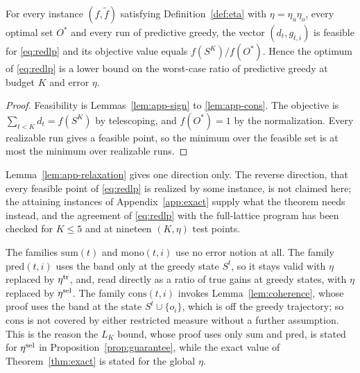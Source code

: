 \begin{lemma}[relaxation]\label{lem:app-relaxation}
For every instance $(f,\tilde f)$ satisfying Definition~\ref{def:eta} with
$\eta=\eta_u\eta_o$, every optimal set $O^{\ast}$ and every run of predictive
greedy, the vector $(d_t,g_{t,i})$ is feasible for \eqref{eq:redlp} and its
objective value equals $f(S^{K})/f(O^{\ast})$.  Hence the optimum of
\eqref{eq:redlp} is a lower bound on the worst-case ratio of predictive greedy
at budget $K$ and error $\eta$.
\end{lemma}
\begin{proof}
Feasibility is Lemmas~\ref{lem:app-sign} to \ref{lem:app-cons}.  The objective
is $\sum_{t<K}d_t=f(S^{K})$ by telescoping, and $f(O^{\ast})=1$ by the
normalization.  Every realizable run gives a feasible point, so the minimum
over the feasible set is at most the minimum over realizable runs.
\end{proof}

\begin{remark}\label{rem:app-status}
Lemma~\ref{lem:app-relaxation} gives one direction only.  The reverse
direction, that every feasible point of \eqref{eq:redlp} is realized by some
instance, is not claimed here; the attaining instances of
Appendix~\ref{app:exact} supply what the theorem needs instead, and the
agreement of \eqref{eq:redlp} with the full-lattice program has been checked
for $K\le5$ and at nineteen $(K,\eta)$ test points.
\end{remark}

\begin{remark}\label{rem:app-rulers}
The families $\mathrm{sum}(t)$ and $\mathrm{mono}(t,i)$ use no error notion at
all.  The family $\mathrm{pred}(t,i)$ uses the band only at the greedy state
$S^{t}$, so it stays valid with $\eta$ replaced by $\eta^{\mathrm{tr}}$, and, read
directly as a ratio of true gains at greedy states, with $\eta$ replaced by
$\eta^{\mathrm{sel}}$.  The family $\mathrm{cons}(t,i)$ invokes
Lemma~\ref{lem:coherence}, whose proof uses the band at the state
$S^{t}\cup\{o_i\}$, which is off the greedy trajectory; so $\mathrm{cons}$ is
not covered by either restricted measure without a further assumption.  This
is the reason the $L_K$ bound, whose proof uses only $\mathrm{sum}$ and
$\mathrm{pred}$, is stated for $\eta^{\mathrm{sel}}$ in
Proposition~\ref{prop:guarantee}, while the exact value of
Theorem~\ref{thm:exact} is stated for the global $\eta$.
\end{remark}

